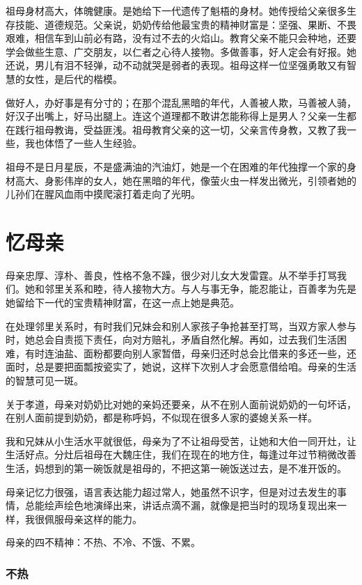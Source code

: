 祖母身材高大，体魄健康。是她给下一代遗传了魁梧的身材。她传授给父亲很多生存技能、道德规范。父亲说，奶奶传给他最宝贵的精神财富是：坚强、果断、不畏艰难，相信车到山前必有路，没有过不去的火焰山。教育父亲不能只会种地，还要学会做些生意、广交朋友，以仁者之心待人接物。多做善事，好人定会有好报。她还说，男儿有泪不轻弹，动不动就哭是弱者的表现。祖母这样一位坚强勇敢又有智慧的女性，是后代的楷模。

做好人，办好事是有分寸的；在那个混乱黑暗的年代，人善被人欺，马善被人骑，好汉子出嘴上，好马出腿上。连这个道理都不敢讲怎能称得上是男人？父亲一生都在践行祖母教诲，受益匪浅。祖母教育父亲的这一切，父亲言传身教，又教了我一些，我也体悟了一些人生经验。

祖母不是日月星辰，不是盛满油的汽油灯，她是一个在困难的年代独撑一个家的身材高大、身影伟岸的女人，她在黑暗的年代，像萤火虫一样发出微光，引领者她的儿孙们在腥风血雨中摸爬滚打着走向了光明。


\section*{忆母亲}

母亲忠厚、淳朴、善良，性格不急不躁，很少对儿女大发雷霆。从不举手打骂我们。她和邻里关系和睦，待人接物大方。与人与事无争，能忍能让，百善孝为先是她留给下一代的宝贵精神财富，在这一点上她是典范。

在处理邻里关系时，有时我们兄妹会和别人家孩子争抢甚至打骂，当双方家人参与时，她总会自责揽下责任，向对方赔礼，矛盾自然化解。再如，过去我们生活困难，有时连油盐、面粉都要向别人家暂借，母亲归还时总会比借来的多还一些，还面时，总是要把面瓢按瓷实了，她说，这样下次别人才会愿意借给咱。母亲的生活的智慧可见一斑。

关于孝道，母亲对奶奶比对她的亲妈还要亲，从不在别人面前说奶奶的一句坏话，在别人面前提到奶奶，都是称呼妈，不似现在很多人家的婆媳关系一样。

我和兄妹从小生活水平就很低，母亲为了不让祖母受苦，让她和大伯一同开灶，让生活好点。分灶后祖母在大魏庄住，我们在现在的地方住，每逢过年过节稍微改善生活，妈想到的第一碗饭就是祖母的，不把这第一碗饭送过去，是不准开饭的。

母亲记忆力很强，语言表达能力超过常人，她虽然不识字，但是对过去发生的事情，总能绘声绘色地演绎出来，讲话点滴不漏，就像是把当时的现场复现出来一样，我很佩服母亲这样的能力。

母亲的四不精神：不热、不冷、不饿、不累。


\subsubsection*{不热}

